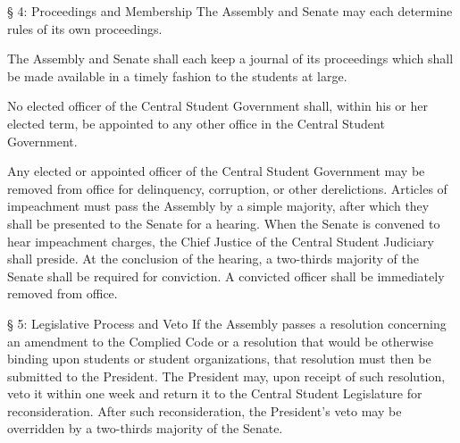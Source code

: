 § 4: Proceedings and Membership
    The Assembly and Senate may each determine rules of its own proceedings.

    The Assembly and Senate shall each keep a journal of its proceedings which shall be made available in a timely fashion to the students at large.

    No elected officer of the Central Student Government shall, within his or her elected term, be appointed to any other office in the Central Student Government.

    Any elected or appointed officer of the Central Student Government may be removed from office for delinquency, corruption, or other derelictions. Articles of impeachment must pass the Assembly by a simple majority, after which they shall be presented to the Senate for a hearing. When the Senate is convened to hear impeachment charges, the Chief Justice of the Central Student Judiciary shall preside. At the conclusion of the hearing, a two-thirds majority of the Senate shall be required for conviction. A convicted officer shall be immediately removed from office.

§ 5: Legislative Process and Veto
    If the Assembly passes a resolution concerning an amendment to the Complied Code or a resolution that would be otherwise binding upon students or student organizations, that resolution must then be submitted to the President. The President may, upon receipt of such resolution, veto it within one week and return it to the Central Student Legislature for reconsideration. After such reconsideration, the President's veto may be overridden by a  two-thirds majority of the Senate.
